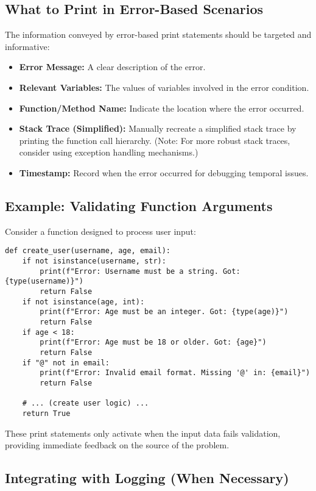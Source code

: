 \documentclass{article}
\begin{document}
{{{\subsection*{What to Print in Error-Based Scenarios}

The information conveyed by error-based print statements should be targeted and informative:

\begin{itemize}
    \item \textbf{Error Message:} A clear description of the error.
    \item \textbf{Relevant Variables:} The values of variables involved in the error condition.
    \item \textbf{Function/Method Name:} Indicate the location where the error occurred.
    \item \textbf{Stack Trace (Simplified):} Manually recreate a simplified stack trace by printing the function call hierarchy.  (Note: For more robust stack traces, consider using exception handling mechanisms.)
    \item \textbf{Timestamp:} Record when the error occurred for debugging temporal issues.
\end{itemize}

\subsection*{Example: Validating Function Arguments}

Consider a function designed to process user input:

\begin{verbatim}
def create_user(username, age, email):
    if not isinstance(username, str):
        print(f"Error: Username must be a string. Got: {type(username)}")
        return False
    if not isinstance(age, int):
        print(f"Error: Age must be an integer. Got: {type(age)}")
        return False
    if age < 18:
        print(f"Error: Age must be 18 or older. Got: {age}")
        return False
    if "@" not in email:
        print(f"Error: Invalid email format. Missing '@' in: {email}")
        return False

    # ... (create user logic) ...
    return True
\end{verbatim}

These print statements only activate when the input data fails validation, providing immediate feedback on the source of the problem.

\subsection*{Integrating with Logging (When Necessary)}

}}}
\end{document}
